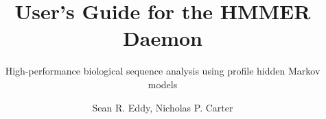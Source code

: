 \title{User's Guide for the HMMER Daemon}

\subtitle{High-performance biological sequence analysis using profile hidden Markov models}

\author{Sean R. Eddy, Nicholas P. Carter}


